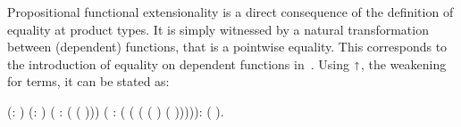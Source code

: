 
\begin{coqdoccode}
\coqdocemptyline
\end{coqdoccode}


  Propositional functional extensionality is a direct consequence of the definition
  of equality at product types. It is simply witnessed by a natural transformation
  between (dependent) functions, that is a pointwise equality. This corresponds 
  to the introduction of equality on dependent functions in~\cite{DBLP:conf/popl/LicataH12}.
  Using $\shortuparrow$, the weakening for terms, it can be stated as:
\begin{coqdoccode}
\coqdocemptyline
\coqdocnoindent
{}   (: ) (: ) ( : ( (\coqdocdefinition{$\Lambda$} )))\coqdoceol
\coqdocindent{1.00em}
( :  ( (\coqdocdefinition{$\Lambda$} ( (  \coqdocnotation{$\star$}  ) (  \coqdocnotation{$\star$}  ))))):  (  ).\coqdoceol
\end{coqdoccode}
